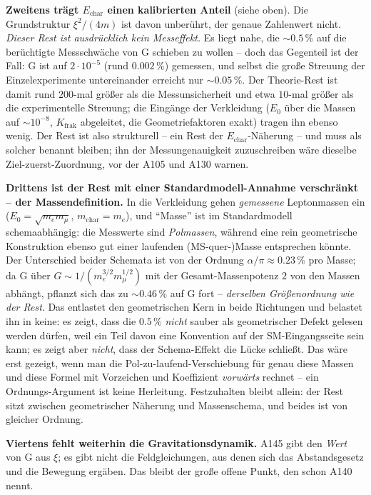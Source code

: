 \textbf{Zweitens trägt $E_\text{char}$ einen kalibrierten Anteil} (siehe oben).
Die Grundstruktur $\xi^2/(4m)$ ist davon unberührt, der genaue Zahlenwert
nicht. \emph{Dieser Rest ist ausdrücklich kein Messeffekt.} Es liegt nahe, die
$\sim0{.}5\,\%$ auf die berüchtigte Messschwäche von G schieben zu wollen -- doch
das Gegenteil ist der Fall: G ist auf $2\cdot10^{-5}$ (rund $0{.}002\,\%$)
gemessen, und selbst die große Streuung der Einzelexperimente untereinander
erreicht nur $\sim0{.}05\,\%$. Der Theorie-Rest ist damit rund $200$-mal größer
als die Messunsicherheit und etwa $10$-mal größer als die experimentelle
Streuung; die Eingänge der Verkleidung ($E_0$ über die Massen auf $\sim10^{-8}$,
$K_\text{frak}$ abgeleitet, die Geometriefaktoren exakt) tragen ihn ebenso wenig.
Der Rest ist also strukturell -- ein Rest der $E_\text{char}$-Näherung -- und
muss als solcher benannt bleiben; ihn der Messungenauigkeit zuzuschreiben wäre
dieselbe Ziel-zuerst-Zuordnung, vor der A105 und A130 warnen.

\textbf{Drittens ist der Rest mit einer Standardmodell-Annahme verschränkt --
der Massendefinition.} In die Verkleidung gehen \emph{gemessene} Leptonmassen
ein ($E_0=\sqrt{m_e m_\mu}$, $m_\text{char}=m_e$), und \enquote{Masse} ist im
Standardmodell schemaabhängig: die Messwerte sind \emph{Polmassen}, während eine
rein geometrische Konstruktion ebenso gut einer laufenden (MS-quer-)Masse
entsprechen könnte. Der Unterschied beider Schemata ist von der Ordnung
$\alpha/\pi \approx 0{.}23\,\%$ pro Masse; da G über
$G\sim 1/(m_e^{3/2} m_\mu^{1/2})$ mit der Gesamt-Massenpotenz $2$ von den Massen
abhängt, pflanzt sich das zu $\sim 0{.}46\,\%$ auf G fort -- \emph{derselben
Größenordnung wie der Rest}. Das entlastet den geometrischen Kern in beide
Richtungen und belastet ihn in keine: es zeigt, dass die $0{.}5\,\%$
\emph{nicht} sauber als geometrischer Defekt gelesen werden dürfen, weil ein Teil
davon eine Konvention auf der SM-Eingangsseite sein kann; es zeigt aber
\emph{nicht}, dass der Schema-Effekt die Lücke schließt. Das wäre erst gezeigt,
wenn man die Pol-zu-laufend-Verschiebung für genau diese Massen und diese Formel
mit Vorzeichen und Koeffizient \emph{vorwärts} rechnet -- ein Ordnungs-Argument
ist keine Herleitung. Festzuhalten bleibt allein: der Rest sitzt zwischen
geometrischer Näherung und Massenschema, und beides ist von gleicher Ordnung.

\textbf{Viertens fehlt weiterhin die Gravitationsdynamik.} A145 gibt den
\emph{Wert} von G aus $\xi$; es gibt nicht die Feldgleichungen, aus denen sich
das Abstandsgesetz und die Bewegung ergäben. Das bleibt der große offene Punkt,
den schon A140 nennt.

